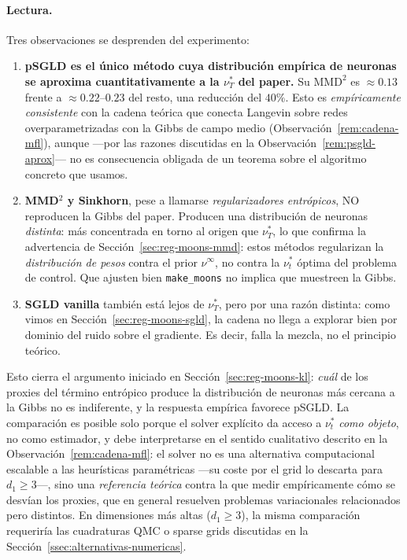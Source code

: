 \documentclass[11pt, a4paper]{article}
\theoremstyle{definition}
\begin{document}
\paragraph{Lectura.}
Tres observaciones se desprenden del experimento:
\begin{enumerate}
  \item \textbf{pSGLD es el único método cuya distribución empírica
        de neuronas se aproxima cuantitativamente a la $\nu^*_T$
        del paper.} Su $\mathrm{MMD}^2$ es $\approx 0.13$ frente a
        $\approx 0.22$--$0.23$ del resto, una reducción del $40\%$.
        Esto es \emph{empíricamente consistente} con la cadena
        teórica que conecta Langevin sobre redes
        overparametrizadas con la Gibbs de campo medio
        (Observación~\ref{rem:cadena-mfl}), aunque ---por las
        razones discutidas en la Observación~\ref{rem:psgld-aprox}---
        no es consecuencia obligada de un teorema sobre el algoritmo
        concreto que usamos.
  \item \textbf{MMD$^2$ y Sinkhorn}, pese a llamarse
        \emph{regularizadores entrópicos}, NO reproducen la
        Gibbs del paper. Producen una distribución de neuronas
        \emph{distinta}: más concentrada en torno al origen que
        $\nu^*_T$, lo que confirma la advertencia de
        Sección~\ref{sec:reg-moons-mmd}: estos métodos
        regularizan la \emph{distribución de pesos} contra el
        prior $\nu^\infty$, no contra la $\nu^*_t$ óptima del
        problema de control. Que ajusten bien
        \texttt{make\_moons} no implica que muestreen la Gibbs.
  \item \textbf{SGLD vanilla} también está lejos de $\nu^*_T$,
        pero por una razón distinta: como vimos en
        Sección~\ref{sec:reg-moons-sgld}, la cadena no llega a
        explorar bien por dominio del ruido sobre el gradiente.
        Es decir, falla la mezcla, no el principio teórico.
\end{enumerate}

Esto cierra el argumento iniciado en
Sección~\ref{sec:reg-moons-kl}: \emph{cuál} de los proxies del
término entrópico produce la distribución de neuronas más cercana
a la Gibbs no es indiferente, y la respuesta empírica favorece
pSGLD. La comparación es posible solo porque el solver explícito
da acceso a $\nu^*_t$ \emph{como objeto}, no como estimador, y debe
interpretarse en el sentido cualitativo descrito en la
Observación~\ref{rem:cadena-mfl}: el solver no es una alternativa
computacional escalable a las heurísticas paramétricas
---su coste por el grid lo descarta para $d_1\geq 3$---, sino una
\emph{referencia teórica} contra la que medir empíricamente cómo se
desvían los proxies, que en general resuelven problemas
variacionales relacionados pero distintos.
En dimensiones más altas ($d_1\geq 3$), la misma comparación
requeriría las cuadraturas QMC o sparse grids discutidas en la
Sección~\ref{ssec:alternativas-numericas}.
\end{document}
